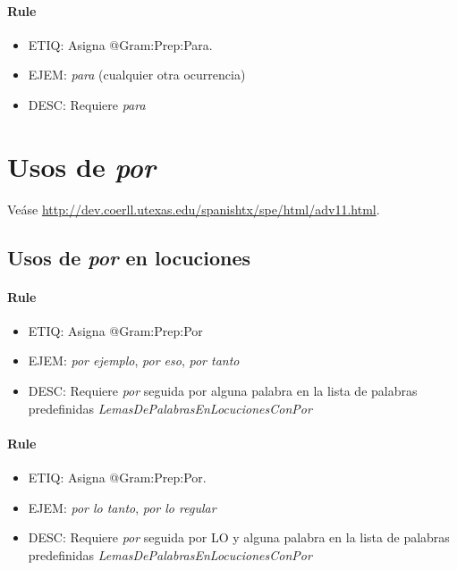 \documentclass[11pt]{report}
\begin{document}
\paragraph*{Rule}
\begin{itemize}
\item ETIQ: Asigna @Gram:Prep:Para.
\item EJEM: \emph{para} (cualquier otra ocurrencia)
\item DESC: Requiere \emph{para}
\end{itemize}

\section{Usos de \emph{por}}
Veáse \url{http://dev.coerll.utexas.edu/spanishtx/spe/html/adv11.html}.

\subsection{Usos de \emph{por} en locuciones}
\paragraph*{Rule}
\begin{itemize}
\item ETIQ: Asigna @Gram:Prep:Por
\item EJEM: \emph{por ejemplo}, \emph{por eso}, \emph{por tanto}
\item DESC: Requiere \emph{por} seguida por alguna palabra en la lista de palabras predefinidas \emph{LemasDePalabrasEnLocucionesConPor}
\end{itemize}

\paragraph*{Rule}
\begin{itemize}
\item ETIQ: Asigna @Gram:Prep:Por.
\item EJEM: \emph{por lo tanto}, \emph{por lo regular}
\item DESC: Requiere \emph{por} seguida por LO y alguna palabra en la lista de palabras predefinidas \emph{LemasDePalabrasEnLocucionesConPor}
\end{itemize}
\end{document}
